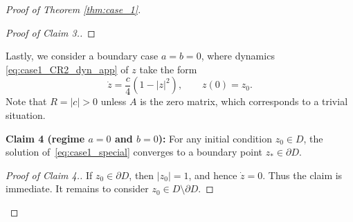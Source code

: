 \documentclass[10pt]{article}
\theoremstyle{definition}
\theoremstyle{definition}
\numberwithin{equation}{section}
\newcommand{\CE}{\mathcal{E}}
\newcommand{\rhoTH}{\rho_{\mathrm{th}}}
\begin{document}
\begin{proof}[Proof of Theorem \ref{thm:case_1}]
\begin{proof}[Proof of Claim 3.]
        
        

        
        
    \end{proof}

Lastly, we consider a boundary case $a = b = 0$, where dynamics \eqref{eq:case1_CR2_dyn_app} of $z$ take the form
\begin{equation}\label{eq:case1_special}
\dot{z} = \frac{c}{4} \left(1 - |z|^2 \right), \qquad z(0) = z_0 .
\end{equation}
Note that $R = |c| > 0$ unless $A$ is the zero matrix, which corresponds to a trivial situation.

\textbf{Claim 4 (regime $a = 0$ and $b = 0$):} For any initial condition $z_0 \in D$, the solution of~\eqref{eq:case1_special} converges to a boundary point $z_* \in \partial D$.

\begin{proof}[Proof of Claim 4.]
If $z_0 \in \partial D$, then $|z_0| = 1$, and hence $\dot{z} = 0$.
Thus the claim is immediate.
It remains to consider $z_0 \in D \setminus \partial D$.


\end{proof}
\end{proof}
\end{document}
